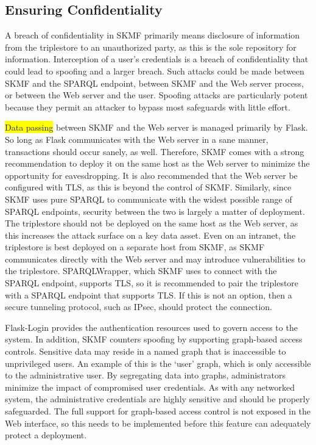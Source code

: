 \subsection{Ensuring Confidentiality}
\label{result:confidentiality}

A breach of confidentiality in SKMF primarily means disclosure of information from the triplestore to an unauthorized party, as this is the sole repository for information. Interception of a user's credentials is a breach of confidentiality that could lead to spoofing and a larger breach. Such attacks could be made between SKMF and the SPARQL endpoint, between SKMF and the Web server process, or between the Web server and the user. Spoofing attacks are particularly potent because they permit an attacker to bypass most safeguards with little effort.

\colorbox{yellow}{Data passing}
between SKMF and the Web server is managed primarily by Flask. So long as Flask communicates with the Web server in a sane manner, transactions should occur sanely, as well. Therefore, SKMF comes with a strong recommendation to deploy it on the same host as the Web server to minimize the opportunity for eavesdropping. It is also recommended that the Web server be configured with TLS, as this is beyond the control of SKMF. Similarly, since SKMF uses pure SPARQL to communicate with the widest possible range of SPARQL endpoints, security between the two is largely a matter of deployment. The triplestore should not be deployed on the same host as the Web server, as this increases the attack surface on a key data asset. Even on an intranet, the triplestore is best deployed on a separate host from SKMF, as SKMF communicates directly with the Web server and may introduce vulnerabilities to the triplestore. SPARQLWrapper, which SKMF uses to connect with the SPARQL endpoint, supports TLS, so it is recommended to pair the triplestore with a SPARQL endpoint that supports TLS. If this is not an option, then a secure tunneling protocol, such as IPsec, should protect the connection.

Flask-Login provides the authentication resources used to govern access to the system. In addition, SKMF counters spoofing by supporting graph-based access controls. Sensitive data may reside in a named graph that is inaccessible to unprivileged users. An example of this is the `user' graph, which is only accessible to the administrative user. By segregating data into graphs, administrators minimize the impact of compromised user credentials. As with any networked system, the administrative credentials are highly sensitive and should be properly safeguarded. The full support for graph-based access control is not exposed in the Web interface, so this needs to be implemented before this feature can adequately protect a deployment.


